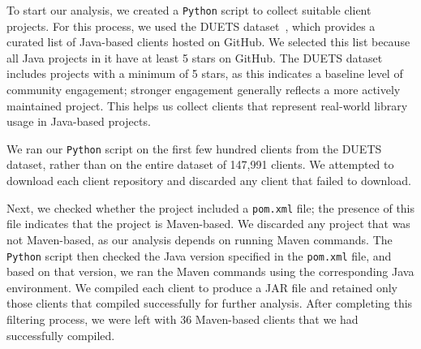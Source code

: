 
To start our analysis, we created a \texttt{Python} script to collect suitable client projects. For this process, we used the DUETS dataset~\cite{durieux21:_duets}, which provides a curated list of Java-based clients hosted on GitHub. We selected this list because all Java projects in it have at least 5 stars on GitHub. The DUETS dataset includes projects with a minimum of 5 stars, as this indicates a baseline level of community engagement; stronger engagement generally reflects a more actively maintained project. This helps us collect clients that represent real-world library usage in Java-based projects.



We ran our \texttt{Python} script on the first few hundred clients from the DUETS dataset, rather than on the entire dataset of 147,991 clients. We attempted to download each client repository and discarded any client that failed to download. 

Next, we checked whether the project included a \texttt{pom.xml} file; the presence of this file indicates that the project is Maven-based. We discarded any project that was not Maven-based, as our analysis depends on running Maven commands. The \texttt{Python} script then checked the Java version specified in the \texttt{pom.xml} file, and based on that version, we ran the Maven commands using the corresponding Java environment. We compiled each client to produce a JAR file and retained only those clients that compiled successfully for further analysis. After completing this filtering process, we were left with 36 Maven-based clients that we had successfully compiled.


